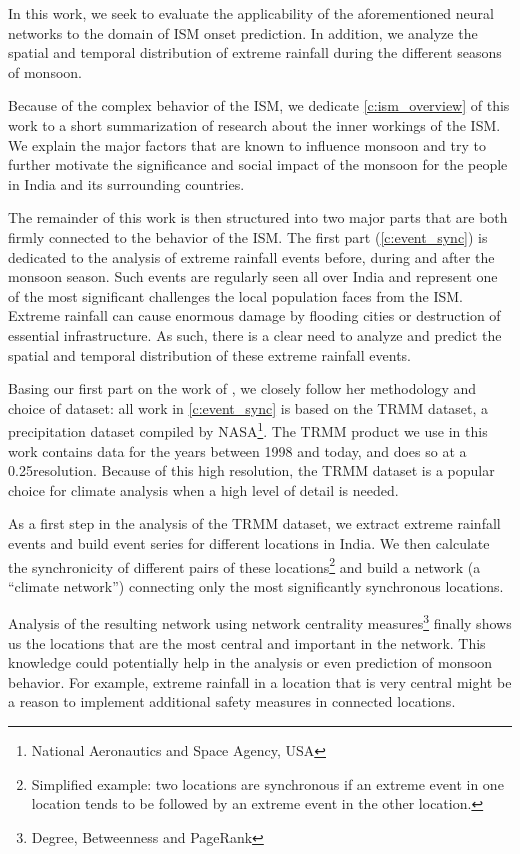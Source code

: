 In this work, we seek to evaluate the applicability of the aforementioned neural networks to the domain of ISM onset prediction. In addition, we analyze the spatial and temporal distribution of extreme rainfall during the different seasons of monsoon.

Because of the complex behavior of the ISM, we dedicate \cref{c:ism_overview} of this work to a short summarization of research about the inner workings of the ISM. We explain the major factors that are known to influence monsoon and try to further motivate the significance and social impact of the monsoon for the people in India and its surrounding countries.

The remainder of this work is then structured into two major parts that are both firmly connected to the behavior of the ISM. The first part (\cref{c:event_sync}) is dedicated to the analysis of extreme rainfall events before, during and after the monsoon season. Such events are regularly seen all over India and represent one of the most significant challenges the local population faces from the ISM. Extreme rainfall can cause enormous damage by flooding cities or destruction of essential infrastructure. As such, there is a clear need to analyze and predict the spatial and temporal distribution of these extreme rainfall events.

Basing our first part on the work of \citet{Stolbova.2015}, we closely follow her methodology and choice of dataset: all work in \cref{c:event_sync} is based on the TRMM dataset, a precipitation dataset compiled by NASA\footnote{National Aeronautics and Space Agency, USA}. The TRMM product we use in this work contains data for the years between 1998 and today, and does so at a 0.25\degree resolution. Because of this high resolution, the TRMM dataset is a popular choice for climate analysis when a high level of detail is needed.

As a first step in the analysis of the TRMM dataset, we extract extreme rainfall events and build event series for different locations in India. We then calculate the synchronicity of different pairs of these locations\footnote{Simplified example: two locations are synchronous if an extreme event in one location tends to be followed by an extreme event in the other location.} and build a network (a ``climate network'') connecting only the most significantly synchronous locations.

Analysis of the resulting network using network centrality measures\footnote{Degree, Betweenness and PageRank} finally shows us the locations that are the most central and important in the network. This knowledge could potentially help in the analysis or even prediction of monsoon behavior. For example, extreme rainfall in a location that is very central might be a reason to implement additional safety measures in connected locations.


